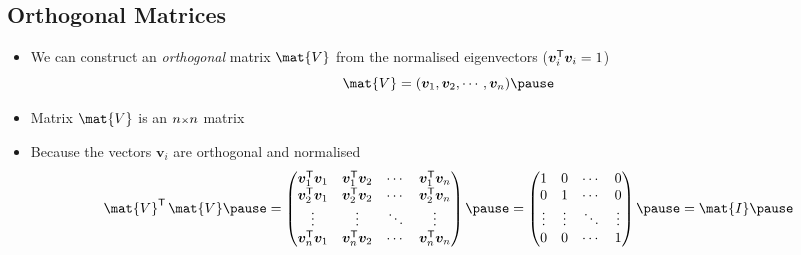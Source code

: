\begin{slide}
\section[-2]{Orthogonal Matrices}

\begin{PauseHighLight}
  \begin{itemize}
  \item We can construct an \emph{orthogonal} matrix $\mat{V}$ from the
    normalised eigenvectors ($\bm{v}_i^{\textsf{T}}\bm{v}_i = 1$)
    \begin{displaymath}
      \mat{V} = (\bm{v}_1, \bm{v}_2 , \cdots, \bm{v}_n)\pause
    \end{displaymath}
    \vspace*{-1cm}
  \item Matrix $\mat{V}$ is an $n{\scriptstyle \times} n$ matrix\pause
  \item Because the vectors $\bm{v}_i$ are orthogonal and normalised
    \begin{displaymath}
      \mat{V}^\tr \, \mat{V} \pause =
      \begin{pmatrix}
        \bm{v}^\tr_1 \bm{v}_1 & \bm{v}^\tr_1 \bm{v}_2 & \cdots &
        \bm{v}^\tr_1 \bm{v}_n
        \\
        \bm{v}^\tr_2 \bm{v}_1 & \bm{v}^\tr_2 \bm{v}_2 & \cdots &
        \bm{v}^\tr_2 \bm{v}_n
        \\
        \vdots & \vdots & \ddots & \vdots
        \\
        \bm{v}^\tr_n \bm{v}_1 & \bm{v}^\tr_n \bm{v}_2 & \cdots &
        \bm{v}^\tr_n \bm{v}_n
      \end{pmatrix} \pause =
      \begin{pmatrix}
        1 & 0 & \cdots & 0 \\
        0 & 1 & \cdots & 0 \\
        \vdots & \vdots & \ddots & \vdots \\
        0 & 0 & \cdots & 1
      \end{pmatrix} \pause
      = \mat{I}\pause
    \end{displaymath}
  \end{itemize}
\end{PauseHighLight}

\end{slide}


